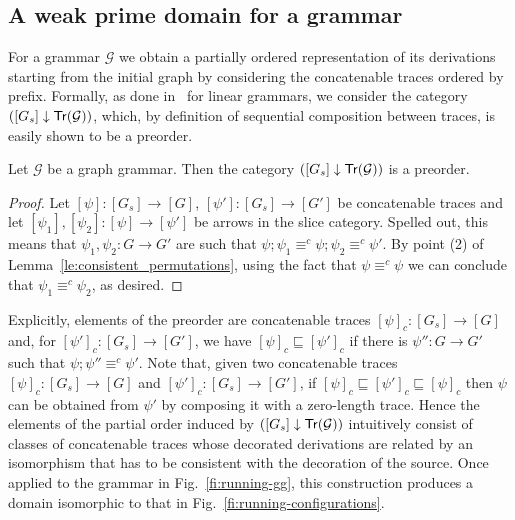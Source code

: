 
\subsection{A weak prime domain for a grammar}
\label{ss:graph-dom}

For a grammar $\mathcal{G}$ we obtain a partially ordered representation of its derivations
starting from the initial graph by considering the concatenable traces ordered 
by prefix. 
%
Formally, as done in~\cite{Handbook,Bal:PhD} for linear
grammars, we consider the category
$({[G_s]} \downarrow {\ensuremath{\mathsf{Tr}({\mathcal{G}})}})$, which, by definition of sequential
composition between traces, is easily shown to be a preorder.

\begin{proposition}
  Let $\mathcal{G}$ be a graph grammar. Then the category
  $({[G_s]} \downarrow {\ensuremath{\mathsf{Tr}({\mathcal{G}})}})$ is a preorder.
\end{proposition}

\begin{proof}
  Let $[\psi] : [G_s] \to [G]$, $[\psi'] : [G_s] \to [G']$ be
  concatenable traces and let
  $[\psi_1], [\psi_2] : [\psi] \to [\psi']$ be arrows in the slice
  category. Spelled out, this means that $\psi_1, \psi_2: G \to G'$
  are such that $\psi; \psi_1 \equiv^c \psi; \psi_2 \equiv^c
  \psi'$. By point (2) of Lemma~\ref{le:consistent_permutations}, 
  using the fact that $\psi \equiv^c \psi$ we can conclude
  that $\psi_1 \equiv^c \psi_2$, as desired. 
%    
 \end{proof}

Explicitly, elements of the preorder are concatenable traces
$[\psi]_c : [G_s] \to [G]$ and, for $[\psi']_c : [G_s] \to [G']$, we
have $[\psi]_c \sqsubseteq [\psi']_c$ if there is $\psi'' : G \to G'$
such that $\psi ; \psi'' \equiv^c \psi'$.
%
Note that, given two concatenable traces $[\psi]_c : [G_s] \to [G]$
and $[\psi']_c : [G_s] \to [G']$, if
$[\psi]_c \sqsubseteq [\psi']_c \sqsubseteq [\psi]_c$ then $\psi$ can be
obtained from $\psi'$  by composing it with a zero-length
trace. Hence the elements of the partial order induced by
$({[G_s]} \downarrow {\ensuremath{\mathsf{Tr}({\mathcal{G}})}})$ intuitively consist of classes of
concatenable traces whose decorated derivations  are
related by an isomorphism that has to be consistent with
the decoration of the source.
%
Once applied to the grammar in Fig.~\ref{fi:running-gg}, this
construction produces a domain isomorphic to that in
Fig.~\ref{fi:running-configurations}.

